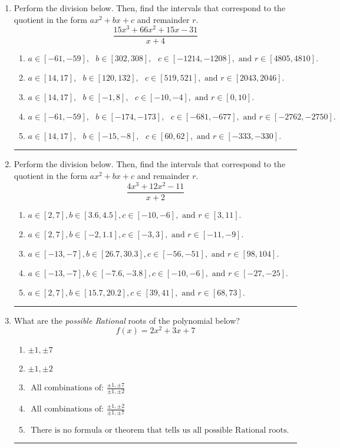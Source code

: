 \documentclass[14pt]{extbook}
\newcommand{\litem}[1]{\item#1\hspace*{-1cm}\rule{\textwidth}{0.4pt}}
\begin{document}
\begin{enumerate}
{\begin{enumerate}[label=\Alph*.]
\end{enumerate} }
\litem{
Perform the division below. Then, find the intervals that correspond to the quotient in the form $ax^2+bx+c$ and remainder $r$.\[ \frac{15x^{3} +66 x^{2} +15 x -31}{x + 4} \]\begin{enumerate}[label=\Alph*.]
\item \( a \in [-61, -59], \text{   } b \in [302, 308], \text{   } c \in [-1214, -1208], \text{   and   } r \in [4805, 4810]. \)
\item \( a \in [14, 17], \text{   } b \in [120, 132], \text{   } c \in [519, 521], \text{   and   } r \in [2043, 2046]. \)
\item \( a \in [14, 17], \text{   } b \in [-1, 8], \text{   } c \in [-10, -4], \text{   and   } r \in [0, 10]. \)
\item \( a \in [-61, -59], \text{   } b \in [-174, -173], \text{   } c \in [-681, -677], \text{   and   } r \in [-2762, -2750]. \)
\item \( a \in [14, 17], \text{   } b \in [-15, -8], \text{   } c \in [60, 62], \text{   and   } r \in [-333, -330]. \)

\end{enumerate} }
\litem{
Perform the division below. Then, find the intervals that correspond to the quotient in the form $ax^2+bx+c$ and remainder $r$.\[ \frac{4x^{3} +12 x^{2} -11}{x + 2} \]\begin{enumerate}[label=\Alph*.]
\item \( a \in [2, 7], b \in [3.6, 4.5], c \in [-10, -6], \text{ and } r \in [3, 11]. \)
\item \( a \in [2, 7], b \in [-2, 1.1], c \in [-3, 3], \text{ and } r \in [-11, -9]. \)
\item \( a \in [-13, -7], b \in [26.7, 30.3], c \in [-56, -51], \text{ and } r \in [98, 104]. \)
\item \( a \in [-13, -7], b \in [-7.6, -3.8], c \in [-10, -6], \text{ and } r \in [-27, -25]. \)
\item \( a \in [2, 7], b \in [15.7, 20.2], c \in [39, 41], \text{ and } r \in [68, 73]. \)

\end{enumerate} }
\litem{
What are the \textit{possible Rational} roots of the polynomial below?\[ f(x) = 2x^{2} +3 x + 7 \]\begin{enumerate}[label=\Alph*.]
\item \( \pm 1,\pm 7 \)
\item \( \pm 1,\pm 2 \)
\item \( \text{ All combinations of: }\frac{\pm 1,\pm 7}{\pm 1,\pm 2} \)
\item \( \text{ All combinations of: }\frac{\pm 1,\pm 2}{\pm 1,\pm 7} \)
\item \( \text{ There is no formula or theorem that tells us all possible Rational roots.} \)


\end{enumerate}}
\end{enumerate}
\end{document}
